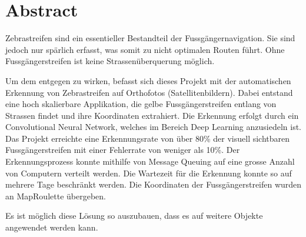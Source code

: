 \section{Abstract}

Zebrastreifen sind ein essentieller Bestandteil der Fussgängernavigation. Sie sind jedoch  nur spärlich erfasst, was somit zu nicht optimalen Routen führt. Ohne Fussgängerstreifen ist keine Strassenüberquerung möglich.

Um dem entgegen zu wirken,  befasst sich dieses Projekt mit der automatischen Erkennung von Zebrastreifen auf Orthofotos (Satellitenbildern). 
Dabei entstand eine hoch skalierbare Applikation, die gelbe Fussgängerstreifen entlang von Strassen findet und ihre Koordinaten extrahiert. Die Erkennung erfolgt durch ein Convolutional Neural Network, welches im Bereich Deep Learning anzusiedeln ist.
Das Projekt erreichte eine Erkennungsrate von über 80\% der visuell sichtbaren Fussgängerstreifen mit einer Fehlerrate von weniger als 10\%. Der Erkennungsprozess konnte mithilfe von Message Queuing auf eine grosse Anzahl von Computern verteilt werden. Die Wartezeit für die Erkennung konnte so auf mehrere Tage beschränkt werden. Die Koordinaten der Fussgängerstreifen wurden an MapRoulette übergeben.

Es ist möglich diese Lösung so auszubauen, dass es auf weitere Objekte angewendet werden kann.
